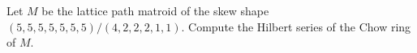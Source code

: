 Let $M$ be the lattice path matroid of the skew shape $(5,5,5,5,5,5,5)/(4,2,2,2,1,1)$.
Compute the Hilbert series of the Chow ring of $M$.
